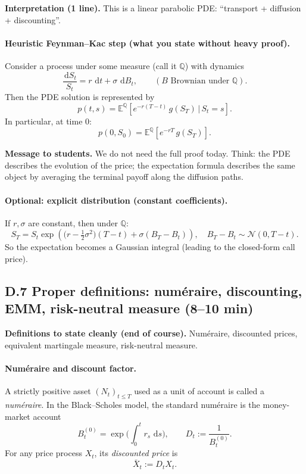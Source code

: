 \documentclass[11pt]{article}
\newcommand{\Qbb}{\mathbb{Q}}
\newcommand{\E}{\mathbb{E}}
\newcommand{\dd}{\,\mathrm{d}}
\newcommand{\1}{\mathbf{1}}
\begin{document}
\textbf{Interpretation (1 line).}
This is a linear parabolic PDE: ``transport + diffusion + discounting''.


\paragraph{Heuristic Feynman--Kac step (what you state without heavy proof).}
Consider a process under some measure (call it $\Qbb$) with dynamics
\[
\frac{\dd S_t}{S_t}=r\,\dd t+\sigma\,\dd B_t,
\qquad (B \text{ Brownian under }\Qbb).
\]
Then the PDE solution is represented by
\[
\boxed{\ p(t,s)=\E^{\Qbb}\!\left[e^{-r(T-t)}\,g(S_T)\,\Big|\,S_t=s\right].\ }
\]
In particular, at time $0$:
\[
\boxed{\ p(0,S_0)=\E^{\Qbb}\!\left[e^{-rT}\,g(S_T)\right].\ }
\]


\textbf{Message to students.}
We do not need the full proof today.
Think: the PDE describes the evolution of the price; the expectation formula
describes the same object by averaging the terminal payoff along the diffusion paths.


\paragraph{Optional: explicit distribution (constant coefficients).}
If $r,\sigma$ are constant, then under $\Qbb$:
\[
S_T = S_t\exp\!\left(\Big(r-\tfrac12\sigma^2\Big)(T-t)+\sigma(B_T-B_t)\right),
\quad B_T-B_t\sim \mathcal N(0,T-t).
\]
So the expectation becomes a Gaussian integral (leading to the closed-form call price).

\subsection*{D.7 Proper definitions: num\'eraire, discounting, EMM, risk-neutral measure (8--10 min)}


\textbf{Definitions to state cleanly (end of course).}
Num\'eraire, discounted prices, equivalent martingale measure, risk-neutral measure.


\paragraph{Num\'eraire and discount factor.}
A strictly positive asset $(N_t)_{t\le T}$ used as a unit of account is called a \emph{num\'eraire}.
In the Black--Scholes model, the standard num\'eraire is the money-market account
\[
B_t^{(0)}=\exp\Big(\int_0^t r_s\,\dd s\Big),
\qquad
D_t:=\frac{1}{B_t^{(0)}}.
\]
For any price process $X_t$, its \emph{discounted price} is
\[
\bar X_t := D_t X_t.
\]
\end{document}
